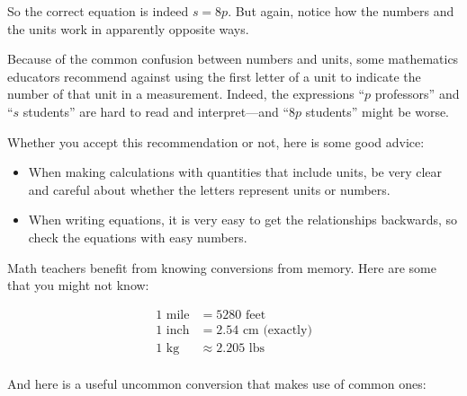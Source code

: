 \documentclass[nooutcomes]{ximera}
\begin{document}
So the correct equation is indeed $s = 8p$.  But again, notice how the numbers and the units work in apparently opposite ways.  

Because of the common confusion between numbers and units, some mathematics educators recommend against using the first letter of a unit to indicate the number of that unit in a measurement.  Indeed, the expressions ``$p$ professors'' and ``$s$ students'' are hard to read and interpret---and ``$8p$ students'' might be worse.  

Whether you accept this recommendation or not, here is some good advice:  
\begin{itemize}
\item When making calculations with quantities that include units, be very clear and careful about whether the letters represent units or numbers.  
\item When writing equations, it is very easy to get the relationships backwards, so check the equations with easy numbers.  
\end{itemize}

Math teachers benefit from knowing conversions from memory.  Here are some that you might not know:  

\begin{align*}
1\textrm{ mile} &= 5280\textrm{ feet} \\
1\textrm{ inch} &= 2.54\textrm{ cm (exactly)} \\
1\textrm{ kg} &\approx 2.205 \textrm{ lbs}\\
\end{align*}

And here is a useful uncommon conversion that makes use of common ones: 
\end{document}
